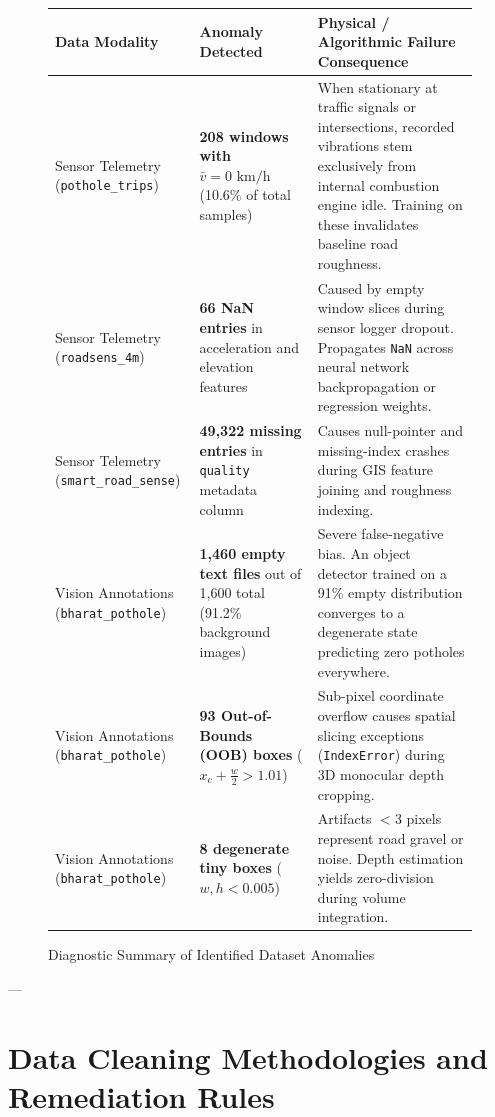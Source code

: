 \documentclass[11pt,a4paper]{article}
\begin{document}
\begin{figure}[htbp]
\centering
\begin{tabularx}{\textwidth}{p{3.5cm}p{4.0cm}p{7.5cm}}
\toprule
\textbf{Data Modality} & \textbf{Anomaly Detected} & \textbf{Physical / Algorithmic Failure Consequence} \\
\midrule
Sensor Telemetry (\texttt{pothole\_trips}) & \textbf{208 windows with $\bar{v} = 0\text{ km/h}$} (10.6\% of total samples) & When stationary at traffic signals or intersections, recorded vibrations stem exclusively from internal combustion engine idle. Training on these invalidates baseline road roughness. \\
\addlinespace
Sensor Telemetry (\texttt{roadsens\_4m}) & \textbf{66 NaN entries} in acceleration and elevation features & Caused by empty window slices during sensor logger dropout. Propagates \texttt{NaN} across neural network backpropagation or regression weights. \\
\addlinespace
Sensor Telemetry (\texttt{smart\_road\_sense}) & \textbf{49,322 missing entries} in \texttt{quality} metadata column & Causes null-pointer and missing-index crashes during GIS feature joining and roughness indexing. \\
\addlinespace
Vision Annotations (\texttt{bharat\_pothole}) & \textbf{1,460 empty text files} out of 1,600 total (91.2\% background images) & Severe false-negative bias. An object detector trained on a 91\% empty distribution converges to a degenerate state predicting zero potholes everywhere. \\
\addlinespace
Vision Annotations (\texttt{bharat\_pothole}) & \textbf{93 Out-of-Bounds (OOB) boxes} ($x_c + \frac{w}{2} > 1.01$) & Sub-pixel coordinate overflow causes spatial slicing exceptions (\texttt{IndexError}) during 3D monocular depth cropping. \\
\addlinespace
Vision Annotations (\texttt{bharat\_pothole}) & \textbf{8 degenerate tiny boxes} ($w, h < 0.005$) & Artifacts $<3$ pixels represent road gravel or noise. Depth estimation yields zero-division during volume integration. \\
\bottomrule
\end{tabularx}
\caption{Diagnostic Summary of Identified Dataset Anomalies}
\label{tab:anomalies}
\end{figure}

---

\section{Data Cleaning Methodologies and Remediation Rules}
\end{document}
